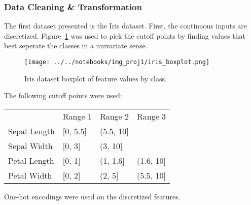 \documentclass{amsart}
\begin{document}
    \subsubsection*{Data Cleaning \& Transformation}
    The first dataset presented is the Iris dataset. First, the continuous inputs are discretized. Figure~\ref{iris_boxplot}
    was used to pick the cutoff points by finding values that best seperate the classes in a univariate sense.
    \begin{figure}
    \centering
    \texttt{[image: ../../notebooks/img\_proj1/iris\_boxplot.png]}
    \caption{Iris dataset boxplot of feature values by class.}
    \label{iris_boxplot}
    \end{figure}
    The following cutoff points were used:
    \begin{table}[]
    \begin{tabular}{llll}
    {} &  Range 1  & Range 2 & Range 3\\
    Sepal Length &  {[}0, 5.5{]} & (5.5, 10{]} & {} \\
    Sepal Width &  {[}0, 3{]} & (3, 10{]} & {} \\
    Petal Length &  {[}0, 1{]} & (1, 1.6{]} & (1.6, 10{]} \\
    Petal Width &  {[}0, 2{]} & (2, 5{]} & (5.5, 10{]}
    \end{tabular}
    \end{table}
    One-hot encodings were used on the discretized features.
\end{document}
